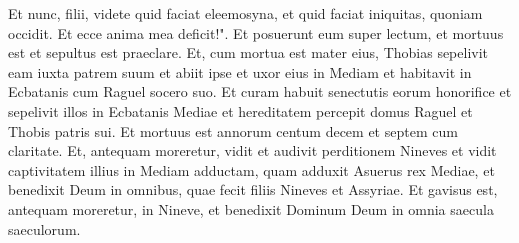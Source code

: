 \begin{biblechapter}
\verse Et nunc, filii, videte quid faciat eleemosyna, et quid faciat iniquitas, quoniam occidit. Et ecce anima mea deficit!". Et posuerunt eum super lectum, et mortuus est et sepultus est praeclare. 
\verse Et, cum mortua est mater eius, Thobias sepelivit eam iuxta patrem suum et abiit ipse et uxor eius in Mediam et habitavit in Ecbatanis cum Raguel socero suo. 
\verse Et curam habuit senectutis eorum honorifice et sepelivit illos in Ecbatanis Mediae et hereditatem percepit domus Raguel et Thobis patris sui.  
\verse Et mortuus est annorum centum decem et septem cum claritate. 
\verse Et, antequam moreretur, vidit et audivit perditionem Nineves et vidit captivitatem illius in Mediam adductam, quam adduxit Asuerus rex Mediae, et benedixit Deum in omnibus, quae fecit filiis Nineves et Assyriae. Et gavisus est, antequam moreretur, in Nineve, et benedixit Dominum Deum in omnia saecula saeculorum.
\end{biblechapter}
